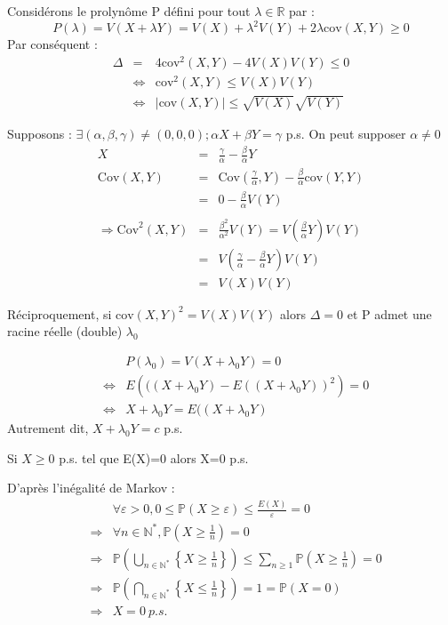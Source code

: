 \begin{dem}
Considérons le prolynôme P défini pour tout $\lambda\in \mathbb{R}$ par : \[P(\lambda)=V(X+\lambda Y)=V(X)+\lambda^2V(Y)+2\lambda \text{cov}(X,Y) \geq 0\]
Par conséquent : \begin{eqnarray*}
\Delta &=& 4 \text{cov}^2(X,Y) - 4V(X)V(Y) \leq 0 \\
&\Leftrightarrow& \text{cov}^2(X,Y)\leq V(X)V(Y) \\
&\Leftrightarrow& |\text{cov}(X,Y)|\leq \sqrt{V(X)}\sqrt{V(Y)}
\end{eqnarray*}

Supposons : $\exists(\alpha,\beta,\gamma)\neq(0,0,0); \alpha X+\beta Y= \gamma$ p.s. On peut supposer $\alpha\neq 0$
\begin{eqnarray*} 
X&=&\frac{\gamma}{\alpha} - \frac{\beta}{\alpha}Y \\
\text{Cov}(X,Y)&=& \text{Cov}(\frac{\gamma}{\alpha},Y) - \frac{\beta}{\alpha} \text{cov}(Y,Y) \\
&=& 0-\frac{\beta}{\alpha} V(Y) \\
\\
\Rightarrow \text{Cov}^2(X,Y)&=& \frac{\beta^2}{\alpha^2} V(Y) = V\left(\frac{\beta}{\alpha}Y \right)V(Y) \\
&=& V\left(\frac{\gamma}{\alpha} - \frac{\beta}{\alpha}Y\right)V(Y) \\
&=& V(X)V(Y)
\end{eqnarray*}

Réciproquement, si $\text{cov}(X,Y)^2=V(X)V(Y)$ alors $\Delta=0$ et P admet une racine réelle (double) $\lambda_0$

\begin{eqnarray*}
&&P(\lambda_0)=V(X+\lambda_0Y)=0 \\
&\Leftrightarrow& E\left(((X+\lambda_0Y)-E((X+\lambda_0Y))^2\right)=0 \\
&\Leftrightarrow& X+\lambda_0Y=E((X+\lambda_0Y)
\end{eqnarray*}
Autrement dit, $X+\lambda_0Y = c$ p.s.
\end{dem}

\begin{lem}
Si $X\geq 0$ p.s. tel que E(X)=0 alors X=0 p.s.
\end{lem}

\begin{dem}
D'après l'inégalité de Markov : 
\begin{eqnarray*}
& &\forall\varepsilon>0, 0\leq\mathbb{P}(X\geq \varepsilon) \leq \frac{E(X)}{\varepsilon}=0 \\
&\Rightarrow& \forall n\in \mathbb{N}^*, \mathbb{P}\left(X\geq \frac{1}{n}\right)=0 \\
&\Rightarrow& \mathbb{P}\left(\bigcup_{n\in \mathbb{N}^*} \left\{X\geq \frac{1}{n}\right\}\right)\leq \sum_{n\geq 1} \mathbb{P}\left(X\geq \frac{1}{n}\right)=0 \\
&\Rightarrow& \mathbb{P}\left(\bigcap_{n\in \mathbb{N}^*} \left\{X\leq \frac{1}{n}\right\}\right)=1=\mathbb{P}(X=0) \\
&\Rightarrow& X=0 \ p.s.
\end{eqnarray*}
\end{dem}

